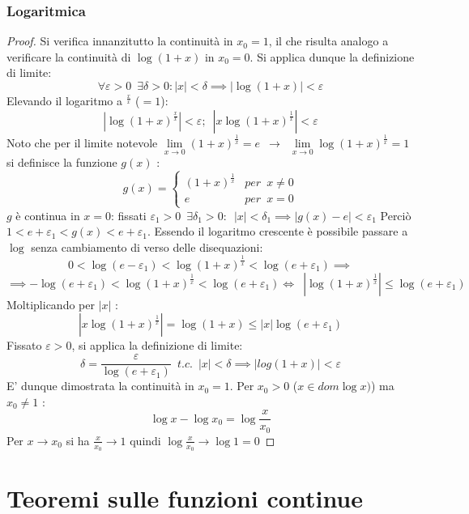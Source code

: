 \documentclass[10pt, oneside]{book}
\theoremstyle{plain}
\begin{document}
\subsubsection{Logaritmica}
\begin{proof}
Si verifica innanzitutto la continuità in $x_0 = 1$, il che risulta analogo a verificare la continuità di $\log (1+x)$ in $x_0 = 0$. Si applica dunque la definizione di limite:
\[\forall \varepsilon > 0 \enspace \exists \delta > 0 : |x| < \delta \implies |\log (1 + x)| < \varepsilon\]
Elevando il logaritmo a $^{\frac{x}{x}}$ ($=1$):
\[|\log (1 + x)^{\frac{x}{x}}| < \varepsilon ; \enspace |x \log (1 + x)^{\frac{1}{x}}| < \varepsilon\]
Noto che per il limite notevole $\lim \limits_{x \rightarrow 0} (1 + x)^{\frac{1}{x}} = e \enspace \longrightarrow \enspace \lim \limits_{x \rightarrow 0} \log (1 + x)^{\frac{1}{x}} = 1$ si definisce la funzione $g(x)$ :
\[g(x) = \begin{cases}
  (1+x)^{\frac{1}{x}} &{per} \enspace x \neq 0 \\
  e &{per} \enspace x = 0
\end{cases}\]
$g$ è continua in $x = 0$: fissati $\varepsilon_1 > 0 \enspace \exists \delta_1 > 0 : \enspace |x| < \delta_1 \implies |g(x) - e| < \varepsilon_1$ \newline
Perciò $1 < e + \varepsilon_1 < g(x) < e + \varepsilon_1$. Essendo il logaritmo crescente è possibile passare a $\log$ senza cambiamento di verso delle disequazioni:
\[0 < \log(e - \varepsilon_1) < \log{(1+x)^{\frac{1}{x}}} < \log(e + \varepsilon_1) \implies\]
\[\implies -\log(e + \varepsilon_1) < \log{(1+x)^{\frac{1}{x}}} < \log(e + \varepsilon_1) \Leftrightarrow \enspace |\log{(1+x)^{\frac{1}{x}}}| \leq \log(e + \varepsilon_1)\]
Moltiplicando per $|x|$ :
\[|x\log{(1+x)^{\frac{1}{x}}}| = \log(1 + x) \leq |x| \log(e + \varepsilon_1)\]
Fissato $\varepsilon > 0$, si applica la definizione di limite:
\[\delta = \frac{\varepsilon}{\log(e + \varepsilon_1)} \enspace {t.c.} \enspace |x| < \delta \implies |log(1+x)| < \varepsilon\]
E' dunque dimostrata la continuità in $x_0 = 1$. Per $x_0 > 0$ ($x \in dom\log x)$) ma $x_0 \neq 1$ :
\[\log x - \log x_0 = \log \frac{x}{x_0}\]
Per $x \rightarrow x_0$ si ha $\frac{x}{x_0} \rightarrow 1$ quindi $\log \frac{x}{x_0} \rightarrow \log 1 = 0$
\end{proof}

\section{Teoremi sulle funzioni continue}
\end{document}
